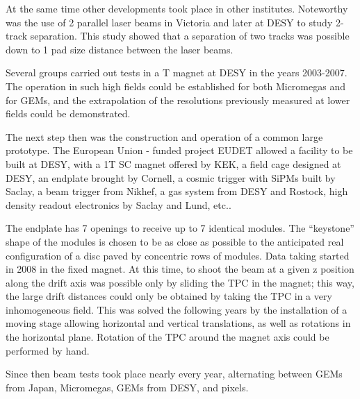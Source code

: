 At the same time other developments took place in other institutes. Noteworthy was the use of 2 parallel laser beams in Victoria and later at DESY to study 2-track separation. This study showed that a separation of two tracks was possible down to 1 pad size distance between the laser beams.

Several groups carried out tests in a \unit[5]{T} magnet at DESY in the years 2003-2007. The operation in such high fields could be established for both Micromegas and for GEMs, and the extrapolation of the resolutions previously measured at lower fields could be demonstrated.

The next step then was the construction and operation of a common large prototype. The European Union - funded project EUDET allowed a facility to be built at DESY, with a 1T SC magnet offered by KEK, a field cage designed at DESY, an endplate brought by Cornell, a cosmic trigger with SiPMs built by Saclay, a beam trigger from Nikhef, a gas system from DESY and Rostock, high density readout electronics by Saclay and Lund, etc..

The endplate has 7 openings to receive up to 7 identical modules. The ``keystone'' shape of the modules is chosen to be as close as possible to the anticipated real configuration of a disc paved by concentric rows of modules. Data taking started in 2008 in the fixed magnet. At this time, to shoot the beam at a given z position along the drift axis was possible only by sliding the TPC in the  magnet; this way, the large drift distances could only be obtained by taking the TPC in a very inhomogeneous field. This was solved the following years by the installation of a moving stage allowing horizontal and vertical translations, as well as rotations in the horizontal plane. Rotation of the TPC around the  magnet axis could be performed by hand.

Since then beam tests took place nearly every year, alternating between GEMs from Japan, Micromegas, GEMs from DESY, and pixels.

%
%







% 
